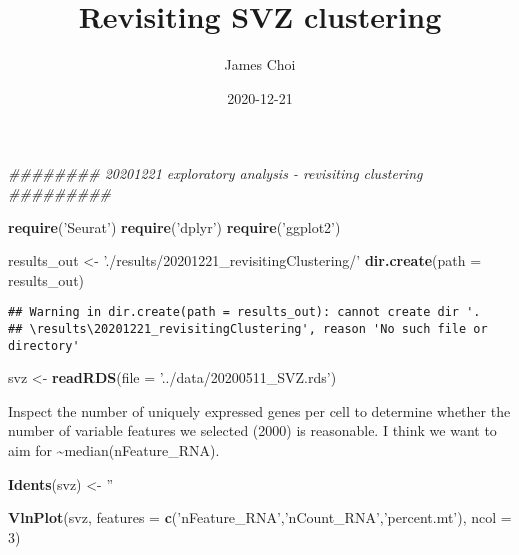 \documentclass[
]{article}
\title{Revisiting SVZ clustering}
\author{James Choi}
\date{2020-12-21}
\newenvironment{Shaded}{\begin{snugshade}}{\end{snugshade}}
\newcommand{\CommentTok}[1]{\textcolor[rgb]{0.56,0.35,0.01}{\textit{#1}}}
\newcommand{\DataTypeTok}[1]{\textcolor[rgb]{0.13,0.29,0.53}{#1}}
\newcommand{\DecValTok}[1]{\textcolor[rgb]{0.00,0.00,0.81}{#1}}
\newcommand{\KeywordTok}[1]{\textcolor[rgb]{0.13,0.29,0.53}{\textbf{#1}}}
\newcommand{\NormalTok}[1]{#1}
\newcommand{\StringTok}[1]{\textcolor[rgb]{0.31,0.60,0.02}{#1}}
\begin{document}
\maketitle

\begin{Shaded}
\begin{Highlighting}[]
\CommentTok{######## 20201221 exploratory analysis - revisiting clustering #########}

\KeywordTok{require}\NormalTok{(}\StringTok{'Seurat'}\NormalTok{)}
\KeywordTok{require}\NormalTok{(}\StringTok{'dplyr'}\NormalTok{)}
\KeywordTok{require}\NormalTok{(}\StringTok{'ggplot2'}\NormalTok{)}

\NormalTok{results_out <-}\StringTok{ './results/20201221_revisitingClustering/'}
\KeywordTok{dir.create}\NormalTok{(}\DataTypeTok{path =}\NormalTok{ results_out)}
\end{Highlighting}
\end{Shaded}

\begin{verbatim}
## Warning in dir.create(path = results_out): cannot create dir '.
## \results\20201221_revisitingClustering', reason 'No such file or directory'
\end{verbatim}

\begin{Shaded}
\begin{Highlighting}[]
\NormalTok{svz <-}\StringTok{ }\KeywordTok{readRDS}\NormalTok{(}\DataTypeTok{file =} \StringTok{'../data/20200511_SVZ.rds'}\NormalTok{)}
\end{Highlighting}
\end{Shaded}

Inspect the number of uniquely expressed genes per cell to determine
whether the number of variable features we selected (2000) is
reasonable. I think we want to aim for
\textasciitilde median(nFeature\_RNA).

\begin{Shaded}
\begin{Highlighting}[]
\KeywordTok{Idents}\NormalTok{(svz) <-}\StringTok{ ''}
\end{Highlighting}
\end{Shaded}

\begin{Shaded}
\begin{Highlighting}[]
\KeywordTok{VlnPlot}\NormalTok{(svz, }\DataTypeTok{features =} \KeywordTok{c}\NormalTok{(}\StringTok{'nFeature_RNA'}\NormalTok{,}\StringTok{'nCount_RNA'}\NormalTok{,}\StringTok{'percent.mt'}\NormalTok{), }\DataTypeTok{ncol =} \DecValTok{3}\NormalTok{)}
\end{Highlighting}
\end{Shaded}
\end{document}

